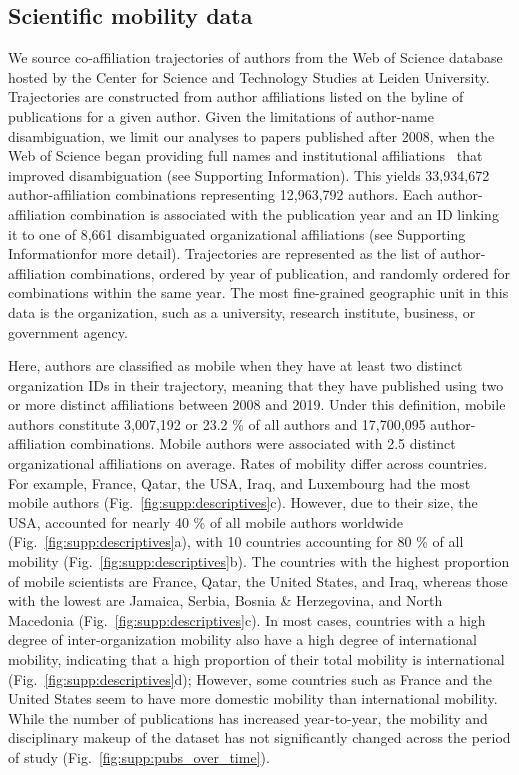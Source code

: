\documentclass[12pt]{article} %
\def\SI{Supporting Information}
\begin{document}
\subsection*{Scientific mobility data}
We source co-affiliation trajectories of authors from the Web of Science database hosted by the Center for Science and Technology Studies at Leiden University.
Trajectories are constructed from author affiliations listed on the byline of publications for a given author.
Given the limitations of author-name disambiguation, we limit our analyses to papers published after 2008, when the Web of Science began providing full names and institutional affiliations~\autocite{caron2014disambiguation} that improved disambiguation (see \SI).
This yields 33,934,672 author-affiliation combinations representing 12,963,792 authors.
Each author-affiliation combination is associated with the publication year and an ID linking it to one of 8,661 disambiguated organizational affiliations (see \SI for more detail).
Trajectories are represented as the list of author-affiliation combinations, ordered by year of publication, and randomly ordered for combinations within the same year. The most fine-grained geographic unit in this data is the organization, such as a university, research institute, business, or government agency.

Here, authors are classified as mobile when they have at least two distinct organization IDs in their trajectory, meaning that they have published using two or more distinct affiliations between 2008 and 2019.
Under this definition, mobile authors constitute 3,007,192 or 23.2 \% of all authors and 17,700,095 author-affiliation combinations.
Mobile authors were associated with 2.5 distinct organizational affiliations on average.
Rates of mobility differ across countries.
For example, France, Qatar, the USA, Iraq, and Luxembourg had the most mobile authors (Fig.~\ref{fig:supp:descriptives}c).
However, due to their size, the USA, accounted for nearly 40 \% of all mobile authors worldwide (Fig.~\ref{fig:supp:descriptives}a), with 10 countries accounting for 80 \% of all mobility (Fig.~\ref{fig:supp:descriptives}b).
The countries with the highest proportion of mobile scientists are France, Qatar, the United States, and Iraq, whereas those with the lowest are Jamaica, Serbia, Bosnia \& Herzegovina, and North Macedonia (Fig.~\ref{fig:supp:descriptives}c).
In most cases, countries with a high degree of inter-organization mobility also have a high degree of international mobility, indicating that a high proportion of their total mobility is international (Fig.~\ref{fig:supp:descriptives}d);
However, some countries such as France and the United States seem to have more domestic mobility than international mobility.
While the number of publications has increased year-to-year, the mobility and disciplinary makeup of the dataset has not significantly changed across the period of study (Fig.~\ref{fig:supp:pubs_over_time}).
\end{document}
